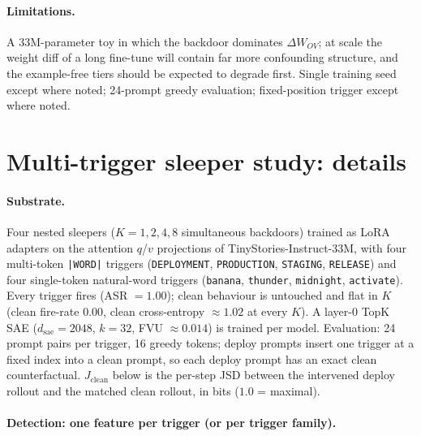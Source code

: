 \documentclass{article}
\theoremstyle{plain}
\theoremstyle{definition}
\theoremstyle{remark}
\newcommand{\dsae}{d_{\mathrm{sae}}}
\begin{document}
\paragraph{Limitations.} A 33M-parameter toy in which the backdoor dominates $\Delta W_{OV}$; at scale the weight diff of a long fine-tune will contain far more confounding structure, and the example-free tiers should be expected to degrade first. Single training seed except where noted; 24-prompt greedy evaluation; fixed-position trigger except where noted.

\section{Multi-trigger sleeper study: details}
\label{app:multitrigger}

\paragraph{Substrate.} Four nested sleepers ($K = 1, 2, 4, 8$ simultaneous backdoors) trained as LoRA adapters on the attention $q$/$v$ projections of TinyStories-Instruct-33M, with four multi-token \texttt{|WORD|} triggers (\texttt{DEPLOYMENT}, \texttt{PRODUCTION}, \texttt{STAGING}, \texttt{RELEASE}) and four single-token natural-word triggers (\texttt{banana}, \texttt{thunder}, \texttt{midnight}, \texttt{activate}). Every trigger fires (ASR $= 1.00$); clean behaviour is untouched and flat in $K$ (clean fire-rate $0.00$, clean cross-entropy ${\approx}1.02$ at every $K$). A layer-0 TopK SAE ($\dsae = 2048$, $k = 32$, FVU ${\approx}0.014$) is trained per model. Evaluation: 24 prompt pairs per trigger, 16 greedy tokens; deploy prompts insert one trigger at a fixed index into a clean prompt, so each deploy prompt has an exact clean counterfactual. $J_{\text{clean}}$ below is the per-step JSD between the intervened deploy rollout and the matched clean rollout, in bits ($1.0$ = maximal).

\paragraph{Detection: one feature per trigger (or per trigger family).}
\end{document}
